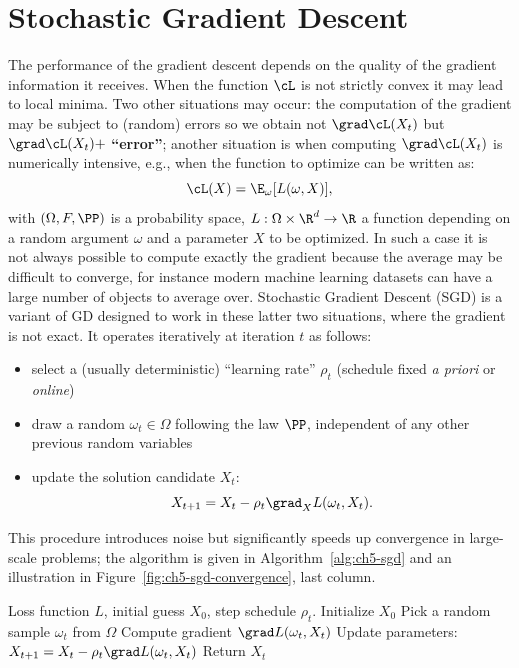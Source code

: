 \section{Stochastic Gradient Descent}
\label{sec:ch5-sgd}

The performance of the gradient descent depends on the quality of the gradient information it receives. When the function $\cL$ is not strictly convex it may lead to local minima. Two other situations may occur: the computation of the gradient may be subject to (random) errors so we obtain not $\grad \cL(X_t)$ but $\grad \cL(X_t) + $ \textbf{``error''}; another situation is when computing $\grad \cL(X_t)$ is numerically intensive, e.g., when the function to optimize can be written as:
\begin{equation}\label{eq:ch5-loss-expectation}
\cL(X) = \E_\omega[L(\omega, X)],
\end{equation}
with $(\Omega, F, \PP)$ is a probability space, $L : \Omega \times \R^d \to \R$ a function depending on a random argument $\omega$ and a parameter $X$ to be optimized. In such a case it is not always possible to compute exactly the gradient because the average may be difficult to converge, for instance modern machine learning datasets can have a large number of objects to average over. Stochastic Gradient Descent (SGD) is a variant of GD designed to work in these latter two situations, where the gradient is not exact. It operates iteratively at iteration $t$ as follows:
\begin{itemize}
    \item select a (usually deterministic) ``learning rate'' $\rho_t$ (schedule fixed \emph{a priori} or \emph{online})
    \item draw a random $\omega_t \in \Omega$ following the law $\PP$, independent of any other previous random variables
    \item update the solution candidate $X_t$:
    \begin{equation}\label{eq:ch5-sgd-update}
    X_{t+1} = X_t - \rho_t \grad_X L(\omega_t, X_t).
    \end{equation}
\end{itemize}

This procedure introduces noise but significantly speeds up convergence in large-scale problems; the algorithm is given in Algorithm~\ref{alg:ch5-sgd} and an illustration in Figure~\ref{fig:ch5-sgd-convergence}, last column.

\begin{algorithm}[h]
\caption{Stochastic Gradient Descent (SGD)}\label{alg:ch5-sgd}
\begin{algorithmic}[1]
\Require Loss function $L$, initial guess $X_0$, step schedule $\rho_t$.
\State Initialize $X_0$
    \State Pick a random sample $\omega_t$ from $\Omega$
    \State Compute gradient $\grad L(\omega_t, X_t)$
    \State Update parameters: $X_{t+1} = X_t - \rho_t \grad L(\omega_t, X_t)$
\EndFor
\State Return $X_t$
\end{algorithmic}
\end{algorithm}

